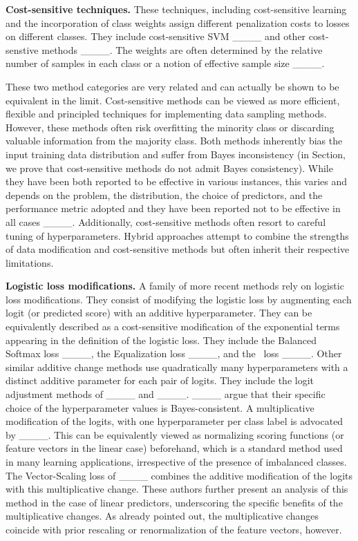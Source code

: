\textbf{Cost-sensitive techniques.} These techniques, including
cost-sensitive learning and the incorporation of class weights assign
different penalization costs to losses on different classes. They
include cost-sensitive SVM ____
and other cost-senstive methods
____. The weights are often determined by the
relative number of samples in each class or a notion of effective
sample size ____.

These two method categories are very related and can actually be shown
to be equivalent in the limit.  Cost-sensitive methods can be viewed
as more efficient, flexible and principled techniques for implementing
data sampling methods.  However, these methods often risk overfitting
the minority class or discarding valuable information from the
majority class.  Both methods inherently bias the input training data
distribution and suffer from Bayes inconsistency (in Section, we prove
that cost-sensitive methods do not admit Bayes consistency). While
they have been both reported to be effective in various instances,
this varies and depends on the problem, the distribution, the choice
of predictors, and the performance metric adopted and they have been
reported not to be effective in all cases ____.
Additionally, cost-sensitive methods often resort to careful tuning of
hyperparameters.  Hybrid approaches attempt to combine the strengths
of data modification and cost-sensitive methods but often inherit
their respective limitations.

\textbf{Logistic loss modifications.}  A family of more recent methods
rely on logistic loss modifications.  They consist of modifying the
logistic loss by augmenting each logit (or predicted score) with an
additive hyperparameter.  They can be equivalently described as a
cost-sensitive modification of the exponential terms appearing in the
definition of the logistic loss.  They include the Balanced Softmax
loss ____, the Equalization loss
____, and the \LDAM\ loss
____. Other similar additive change methods use
quadratically many hyperparameters with a distinct additive parameter
for each pair of logits. They include the logit adjustment methods of
____ and ____.
____ argue that their specific choice of the
hyperparameter values is Bayes-consistent.
%
A multiplicative modification of the logits, with one hyperparameter
per class label is advocated by ____. This can be
equivalently viewed as normalizing scoring functions (or feature
vectors in the linear case) beforehand, which is a standard method
used in many learning applications, irrespective of the presence of
imbalanced classes. The Vector-Scaling loss of ____
combines the additive modification of the logits with this
multiplicative change. These authors further present an analysis of
this method in the case of linear predictors, underscoring the
specific benefits of the multiplicative changes.  As already pointed
out, the multiplicative changes coincide with prior rescaling or
renormalization of the feature vectors, however.

